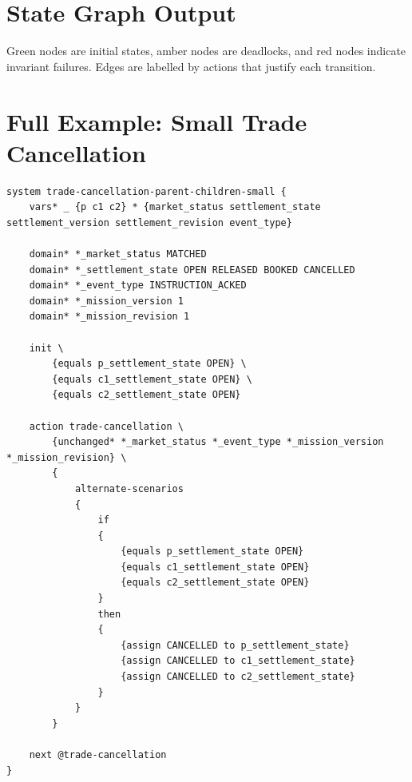 \documentclass[11pt]{article}
\begin{document}
\section{State Graph Output}

\begin{center}
\end{center}

Green nodes are initial states, amber nodes are deadlocks, and red nodes
indicate invariant failures.  Edges are labelled by actions that justify each
transition.

\section{Full Example: Small Trade Cancellation}

\begin{lstlisting}[language=TDSTR]
system trade-cancellation-parent-children-small {
    vars* _ {p c1 c2} * {market_status settlement_state settlement_version settlement_revision event_type}

    domain* *_market_status MATCHED
    domain* *_settlement_state OPEN RELEASED BOOKED CANCELLED
    domain* *_event_type INSTRUCTION_ACKED
    domain* *_mission_version 1
    domain* *_mission_revision 1

    init \
        {equals p_settlement_state OPEN} \
        {equals c1_settlement_state OPEN} \
        {equals c2_settlement_state OPEN}

    action trade-cancellation \
        {unchanged* *_market_status *_event_type *_mission_version *_mission_revision} \
        {
            alternate-scenarios
            {
                if
                {
                    {equals p_settlement_state OPEN}
                    {equals c1_settlement_state OPEN}
                    {equals c2_settlement_state OPEN}
                }
                then
                {
                    {assign CANCELLED to p_settlement_state}
                    {assign CANCELLED to c1_settlement_state}
                    {assign CANCELLED to c2_settlement_state}
                }
            }
        }

    next @trade-cancellation
}
\end{lstlisting}
\end{document}
